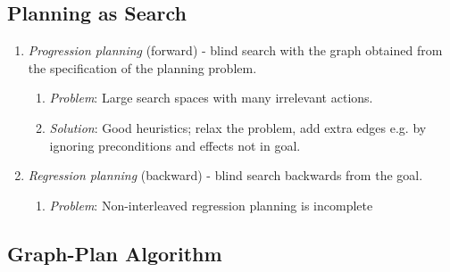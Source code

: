\documentclass[twocolumn,english]{article}
\begin{document}
\subsection{Planning as Search}
\begin{enumerate}
\item \emph{Progression planning} (forward) - blind search with the graph
obtained from the specification of the planning problem.
\begin{enumerate}
\item \emph{Problem}: Large search spaces with many irrelevant actions.
\item \emph{Solution}: Good heuristics; relax the problem, add extra edges
e.g. by ignoring preconditions and effects not in goal.
\end{enumerate}
\item \emph{Regression planning} (backward) - blind search backwards from
the goal.
\begin{enumerate}
\item \emph{Problem}: Non-interleaved regression planning is incomplete
\end{enumerate}
\end{enumerate}

\subsection{Graph-Plan Algorithm}
\end{document}
